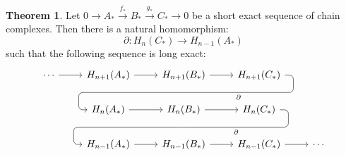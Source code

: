 \documentclass[11pt, oneside]{amsart}   	%
\theoremstyle{definition}
\newtheorem{theorem}{Theorem}[section]
\begin{document}
\begin{theorem}
	Let $0\rightarrow A_*\xrightarrow{f_*} B_*\xrightarrow{g_*} C_*\rightarrow 0$ be a short exact sequence of chain 
	complexes. Then there is a natural homomorphism:
	\begin{equation}
		\partial : H_n(C_*)\rightarrow H_{n - 1}(A_*)
	\end{equation}
	such that the following sequence is long exact:
	\[\begin{tikzcd}
		\cdots\arrow[r] & H_{n + 1}(A_*)\arrow[r] & H_{n + 1}(B_*)\arrow[r] \arrow[d, phantom, ""{coordinate, name=Z}] & 
		H_{n + 1}(C_*) \arrow[dll, "\partial", rounded corners, 
		to path={ -- ([xshift=2ex]\tikztostart.east)
                |- (Z) [near end]\tikztonodes
                -| ([xshift=-2ex]\tikztotarget.west)
                -- (\tikztotarget)}] & \\
		& H_n(A_*)\arrow[r] & H_n(B_*)\arrow[r] \arrow[d, phantom, ""{coordinate, name=W}] & H_n(C_*) 
		\arrow[dll, "\partial", rounded corners, 
		to path={ -- ([xshift=2ex]\tikztostart.east)
                |- (W) [near end]\tikztonodes
                -| ([xshift=-2ex]\tikztotarget.west)
                -- (\tikztotarget)}] & \\
		 & H_{n - 1}(A_*)\arrow[r] & H_{n - 1}(B_*)\arrow[r] & H_{n - 1}(C_*)\arrow[r] & \cdots \\
	\end{tikzcd}\]
\end{theorem}
\end{document}
